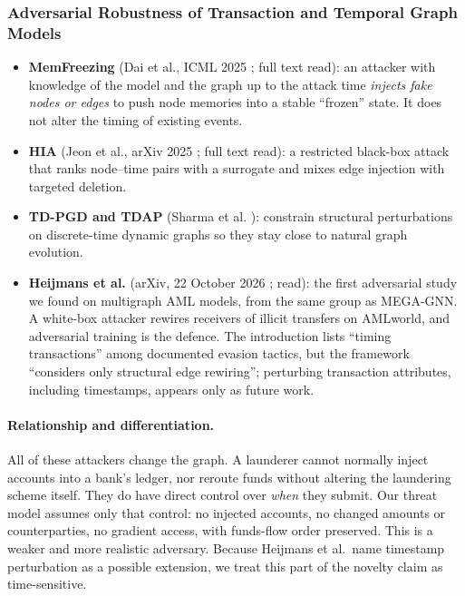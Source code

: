 \documentclass[11pt,a4paper]{article}
\begin{document}
\subsubsection{Adversarial Robustness of Transaction and Temporal Graph Models}
\label{sec:adversarial_work}
\begin{itemize}[leftmargin=*]
    \item \textbf{MemFreezing} (Dai et al., ICML 2025 \cite{dai2025memfreezing}; full text read): an attacker with knowledge of the model and the graph up to the attack time \emph{injects fake nodes or edges} to push node memories into a stable ``frozen'' state. It does not alter the timing of existing events.
    \item \textbf{HIA} (Jeon et al., arXiv 2025 \cite{jeon2025hia}; full text read): a restricted black-box attack that ranks node--time pairs with a surrogate and mixes edge injection with targeted deletion.
    \item \textbf{TD-PGD and TDAP} (Sharma et al. \cite{sharma2023tdap}): constrain structural perturbations on discrete-time dynamic graphs so they stay close to natural graph evolution.
    \item \textbf{Heijmans et al.} (arXiv, 22 October 2026 \cite{heijmans2026robust}; read): the first adversarial study we found on multigraph AML models, from the same group as MEGA-GNN. A white-box attacker rewires receivers of illicit transfers on AMLworld, and adversarial training is the defence. The introduction lists ``timing transactions'' among documented evasion tactics, but the framework ``considers only structural edge rewiring''; perturbing transaction attributes, including timestamps, appears only as future work.
\end{itemize}

\paragraph{Relationship and differentiation.} All of these attackers change the graph. A launderer cannot normally inject accounts into a bank's ledger, nor reroute funds without altering the laundering scheme itself. They do have direct control over \emph{when} they submit. Our threat model assumes only that control: no injected accounts, no changed amounts or counterparties, no gradient access, with funds-flow order preserved. This is a weaker and more realistic adversary. Because Heijmans et al.\ name timestamp perturbation as a possible extension, we treat this part of the novelty claim as time-sensitive.
\end{document}
